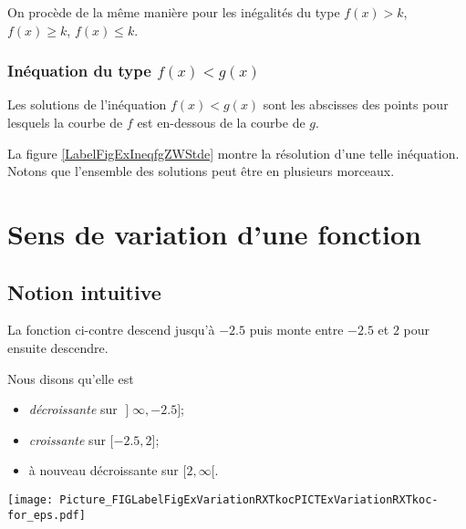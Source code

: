 On procède de la même manière pour les inégalités du type $f(x)>k$, $f(x)\geq k$, $f(x)\leq k$. 

\subsubsection{Inéquation du type $f(x)<g(x)$}

Les solutions de l'inéquation $f(x)<g(x)$ sont les abscisses des points pour lesquels la courbe de \( f\) est en-dessous de la courbe de \( g\).


\newcommand{\CaptionFigExIneqfgZWStde}{En cyan, l'ensemble des solutions de l'inéquation \( f(x)<g(x)\).}


La figure \ref{LabelFigExIneqfgZWStde} montre la résolution d'une telle inéquation. Notons que l'ensemble des solutions peut être en plusieurs morceaux.


\section{Sens de variation d'une fonction}

\subsection{Notion intuitive}

\begin{multicols}{2}

    La fonction ci-contre descend jusqu'à \( -2.5\) puis monte entre \( -2.5\) et \( 2\) pour ensuite descendre.

    Nous disons qu'elle est
    \begin{itemize}
        \item 
            \emph{décroissante} sur \( \mathopen] \infty , -2.5 \mathclose]\);
        \item
            \emph{croissante} sur \( \mathopen[ -2.5 , 2 \mathclose]\);
        \item
            à nouveau décroissante sur \( \mathopen[ 2 , \infty [\).
    \end{itemize}
    
    \columnbreak

    \texttt{[image: Picture\_FIGLabelFigExVariationRXTkocPICTExVariationRXTkoc-for\_eps.pdf]}
\end{multicols}


